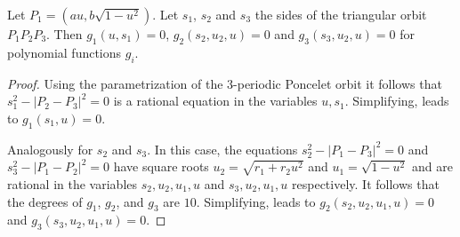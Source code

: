 \begin{lemma}
\label{lem:2sides} Let $P_1=(a u,b\sqrt{1-u^2}).$ Let $s_1$, $s_2$ and $s_3$ the sides of the triangular orbit ${P_1}{P_2}{P_3}$. Then $g_1(u,s_1)=0$, $g_2(s_2,u_2,u)=0$ and $g_3(s_3,u_2,u)=0$ for polynomial functions $g_i$.  
\end{lemma}
	
\begin{proof}
Using the parametrization of the 3-periodic Poncelet orbit it follows that $s_1^2-|P_2-P_3|^2=0$ is a rational equation in the variables $u,s_1$. Simplifying, leads to $g_1(s_1,u)=0.$

Analogously for $s_2$ and $s_3$. In this case, the equations $s_2^2-|P_1-P_3|^2=0$ and  $s_3^2-|P_1-P_2|^2=0$   have   square roots $u_2=\sqrt{r_1+r_2 u^2}$ and $u_1=\sqrt{1-u^2}$ and  are rational in the variables $s_2,u_2,u_1,u$ and $s_3,u_2,u_1,u$ respectively. It follows that the degrees of $g_1$, $g_2$, and $g_3$ are $10$.  Simplifying, leads to $g_2(s_2,u_2,u_1,u)=0 $ and $g_3(s_3,u_2,u_1,u)=0$. 
\end{proof}

